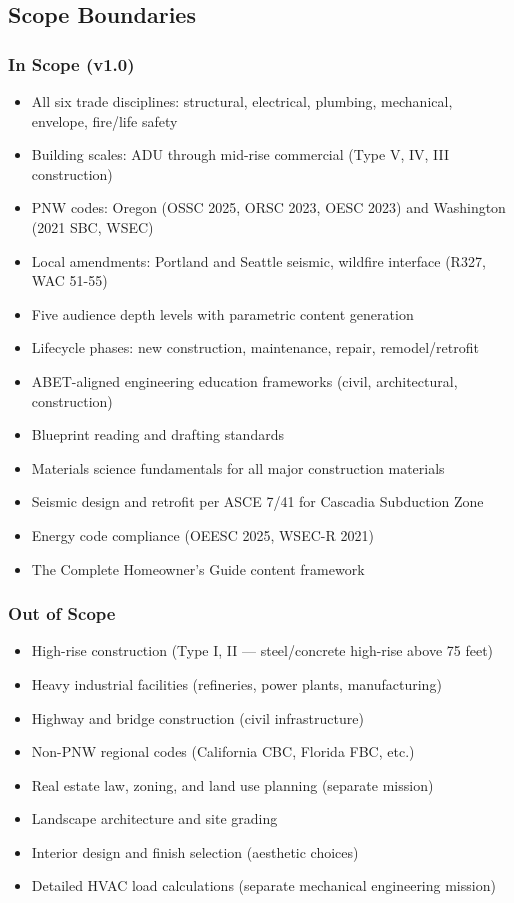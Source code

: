 \documentclass[11pt,letterpaper]{article}
\begin{document}
\subsection{Scope Boundaries}

\subsubsection{In Scope (v1.0)}

\begin{itemize}[leftmargin=2em]
\item All six trade disciplines: structural, electrical, plumbing, mechanical, envelope, fire/life safety
\item Building scales: ADU through mid-rise commercial (Type V, IV, III construction)
\item PNW codes: Oregon (OSSC 2025, ORSC 2023, OESC 2023) and Washington (2021 SBC, WSEC)
\item Local amendments: Portland and Seattle seismic, wildfire interface (R327, WAC 51-55)
\item Five audience depth levels with parametric content generation
\item Lifecycle phases: new construction, maintenance, repair, remodel/retrofit
\item ABET-aligned engineering education frameworks (civil, architectural, construction)
\item Blueprint reading and drafting standards
\item Materials science fundamentals for all major construction materials
\item Seismic design and retrofit per ASCE 7/41 for Cascadia Subduction Zone
\item Energy code compliance (OEESC 2025, WSEC-R 2021)
\item The Complete Homeowner's Guide content framework
\end{itemize}

\subsubsection{Out of Scope}

\begin{itemize}[leftmargin=2em]
\item High-rise construction (Type I, II --- steel/concrete high-rise above 75 feet)
\item Heavy industrial facilities (refineries, power plants, manufacturing)
\item Highway and bridge construction (civil infrastructure)
\item Non-PNW regional codes (California CBC, Florida FBC, etc.)
\item Real estate law, zoning, and land use planning (separate mission)
\item Landscape architecture and site grading
\item Interior design and finish selection (aesthetic choices)
\item Detailed HVAC load calculations (separate mechanical engineering mission)
\end{itemize}
\end{document}

